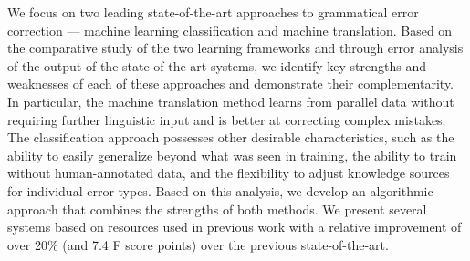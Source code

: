 We focus on two leading state-of-the-art approaches to grammatical error correction --- machine learning classification and machine translation. Based on the comparative study of the two learning frameworks and through error analysis of the output of the state-of-the-art systems, we identify key strengths and weaknesses of each of these approaches and demonstrate their complementarity. In particular, the machine translation method learns from parallel data without requiring further linguistic input and is better at correcting complex mistakes. The classification approach possesses other desirable characteristics, such as the ability to easily generalize beyond what was seen in training, the ability to train without human-annotated data, and the flexibility to adjust knowledge sources for individual error types. Based on this analysis, we develop an algorithmic approach that combines the strengths of both methods. We present several systems based on resources used in previous work with a relative improvement of over 20\% (and 7.4 F score points) over the previous state-of-the-art.
